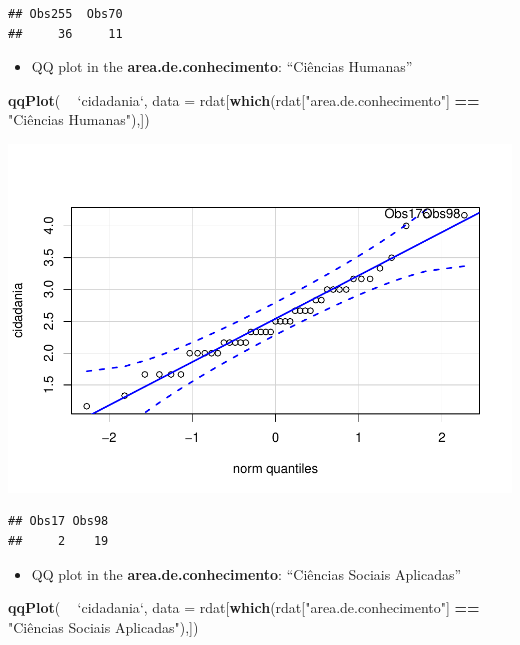 \documentclass[]{article}
\newenvironment{Shaded}{\begin{snugshade}}{\end{snugshade}}
\newcommand{\DataTypeTok}[1]{\textcolor[rgb]{0.13,0.29,0.53}{#1}}
\newcommand{\KeywordTok}[1]{\textcolor[rgb]{0.13,0.29,0.53}{\textbf{#1}}}
\newcommand{\NormalTok}[1]{#1}
\newcommand{\OperatorTok}[1]{\textcolor[rgb]{0.81,0.36,0.00}{\textbf{#1}}}
\newcommand{\StringTok}[1]{\textcolor[rgb]{0.31,0.60,0.02}{#1}}
\providecommand{\tightlist}{%
  \setlength{\itemsep}{0pt}\setlength{\parskip}{0pt}}
\begin{document}
\begin{verbatim}
## Obs255  Obs70 
##     36     11
\end{verbatim}

\begin{itemize}
\tightlist
\item
  QQ plot in the \textbf{area.de.conhecimento}: ``Ciências Humanas''
\end{itemize}

\begin{Shaded}
\begin{Highlighting}[]
\KeywordTok{qqPlot}\NormalTok{( }\OperatorTok{~}\StringTok{ `}\DataTypeTok{cidadania}\StringTok{`}\NormalTok{, }\DataTypeTok{data =}\NormalTok{ rdat[}\KeywordTok{which}\NormalTok{(rdat[}\StringTok{"area.de.conhecimento"}\NormalTok{] }\OperatorTok{==}\StringTok{ "Ciências Humanas"}\NormalTok{),])}
\end{Highlighting}
\end{Shaded}

\includegraphics{factorialAnova_files/figure-latex/unnamed-chunk-13-1.pdf}

\begin{verbatim}
## Obs17 Obs98 
##     2    19
\end{verbatim}

\begin{itemize}
\tightlist
\item
  QQ plot in the \textbf{area.de.conhecimento}: ``Ciências Sociais
  Aplicadas''
\end{itemize}

\begin{Shaded}
\begin{Highlighting}[]
\KeywordTok{qqPlot}\NormalTok{( }\OperatorTok{~}\StringTok{ `}\DataTypeTok{cidadania}\StringTok{`}\NormalTok{, }\DataTypeTok{data =}\NormalTok{ rdat[}\KeywordTok{which}\NormalTok{(rdat[}\StringTok{"area.de.conhecimento"}\NormalTok{] }\OperatorTok{==}\StringTok{ "Ciências Sociais Aplicadas"}\NormalTok{),])}
\end{Highlighting}
\end{Shaded}
\end{document}
